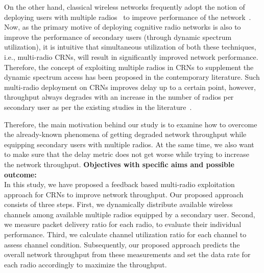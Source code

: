 \documentclass[12pt,addpoints,fleqn]{exam}
\begin{document}
\begin{questions}

On the other hand, classical wireless networks frequently adopt the notion of deploying users with multiple radios~\cite{bahl2004reconsidering, adya2004multi} to improve performance of the network~\cite{draves2004routing, bahl2004reconsidering, miu2005improving, song2012performance}. Now, as the primary motive of deploying cognitive radio networks is also to improve the performance of secondary users (through dynamic spectrum utilization), it is intuitive that simultaneous utilization of both these techniques, i.e., multi-radio CRNs, will result in significantly improved network performance. Therefore, the concept of exploiting multiple radios in CRNs to supplement the dynamic spectrum access has been proposed in the contemporary literature. Such multi-radio deployment on CRNs improves delay up to a certain point, however, throughput always degrades with an increase in the number of radios per secondary user as per the existing studies in the literature~\cite{khan2015towards}.

Therefore, the main motivation behind our study is to examine how to overcome the already-known phenomena of getting degraded network throughput while equipping secondary users with multiple radios. At the same time, we also want to make sure that the delay metric does not get worse while trying to increase the network throughput.
{\bfseries \question
\textbf{Objectives with specific aims and possible outcome:}}\\
In this study, we have proposed a feedback based multi-radio exploitation approach for CRNs to improve network throughput. Our proposed approach consists of three steps. First, we dynamically distribute available wireless channels among available multiple radios equipped by a secondary user. Second, we measure packet delivery ratio for each radio, to evaluate their individual performance. Third, we calculate channel utilization ratio for each channel to assess channel condition. Subsequently, our proposed approach predicts the overall network throughput from these measurements and set the data rate for each radio accordingly to maximize the throughput.


\end{questions}
\end{document}
